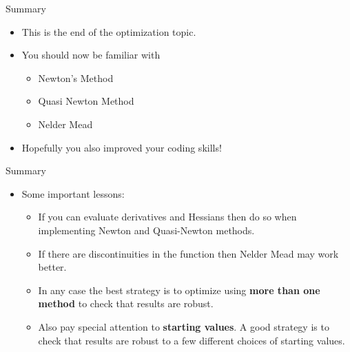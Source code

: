 \documentclass[10pt]{beamer}
\begin{document}
     \begin{frame}{Summary}
       \begin{itemize}
       \item This is the end of the optimization topic.
       \item You should now be familiar with
         \begin{itemize}
         \item Newton's Method
         \item Quasi Newton Method
         \item Nelder Mead
         \end{itemize}
       \item Hopefully you also improved your coding skills!
       \end{itemize}
     \end{frame}
     \begin{frame}{Summary}
       \begin{itemize}
       \item Some important lessons:
         \begin{itemize}
         \item If you can evaluate derivatives and Hessians then do so when implementing Newton and Quasi-Newton methods.

         \item If there are discontinuities in the function then Nelder Mead may work better.

         \item In any case the best strategy is to optimize using {\bf more than one method} to check that results are robust.

         \item Also pay special attention to {\bf starting values}. A good strategy is to check that results are robust to a few different choices of starting values.
         \end{itemize}
       \end{itemize}
     \end{frame}
   
\end{document}
